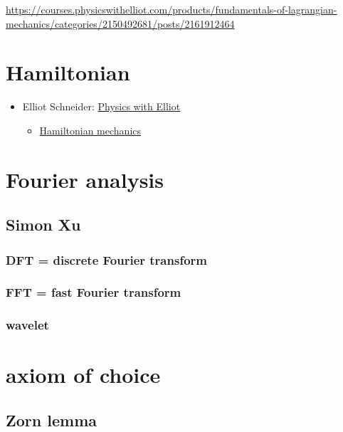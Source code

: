 \documentclass[
]{book}
\providecommand{\tightlist}{%
  \setlength{\itemsep}{0pt}\setlength{\parskip}{0pt}}
\theoremstyle{definition}
\theoremstyle{definition}
\theoremstyle{definition}
\theoremstyle{definition}
\theoremstyle{remark}
\begin{document}
\url{https://courses.physicswithelliot.com/products/fundamentals-of-lagrangian-mechanics/categories/2150492681/posts/2161912464}

\chapter{Hamiltonian}\label{hamiltonian}

\begin{itemize}
\tightlist
\item
  Elliot Schneider: \href{https://www.youtube.com/@PhysicswithElliot/playlists}{Physics with Elliot}

  \begin{itemize}
  \tightlist
  \item
    \href{https://www.youtube.com/playlist?list=PL-IZN8QRUw-zBECgfYLuDQ3qkWsXWAGhM}{Hamiltonian mechanics}
  \end{itemize}
\end{itemize}

\chapter{Fourier analysis}\label{fourier-analysis}

\section{Simon Xu}\label{simon-xu}

\subsection{DFT = discrete Fourier transform}\label{dft-discrete-fourier-transform}

\subsection{FFT = fast Fourier transform}\label{fft-fast-fourier-transform}

\subsection{wavelet}\label{wavelet}

\chapter{axiom of choice}\label{axiom-of-choice}

\section{Zorn lemma}\label{zorn-lemma}
\end{document}
